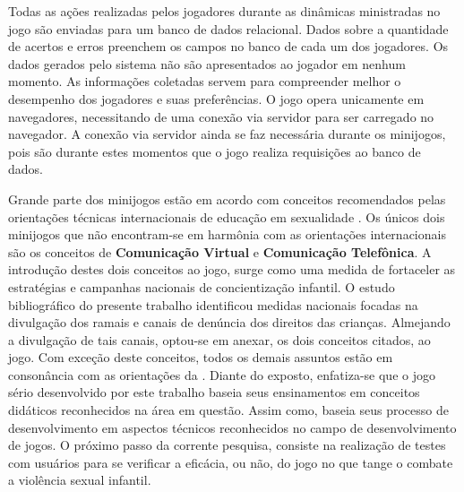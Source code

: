 Todas as ações realizadas pelos jogadores durante as dinâmicas ministradas no jogo são enviadas para um banco de dados relacional. Dados sobre a quantidade de acertos e erros preenchem os campos no banco de cada um dos jogadores. Os dados gerados pelo sistema não são apresentados ao jogador em nenhum momento. As informações coletadas servem para compreender melhor o desempenho dos jogadores e suas preferências. O jogo opera unicamente em navegadores, necessitando de uma conexão via servidor para ser carregado no navegador. A conexão via servidor ainda se faz necessária durante os minijogos, pois são durante estes momentos que o jogo realiza requisições ao banco de dados. 


Grande parte dos minijogos estão em acordo com conceitos recomendados pelas orientações técnicas internacionais de educação em sexualidade \cite{women2018international}. Os únicos dois minijogos que não encontram-se em harmônia com as orientações internacionais são os conceitos de \textbf{Comunicação Virtual} e \textbf{Comunicação Telefônica}. A introdução destes dois conceitos ao jogo, surge como uma medida de fortaceler as estratégias e campanhas nacionais de concientização infantil. O estudo bibliográfico do presente trabalho identificou medidas nacionais focadas na divulgação dos ramais e canais de denúncia dos direitos das crianças. Almejando a divulgação de tais canais, optou-se em anexar, os dois conceitos citados, ao jogo. Com exceção deste conceitos, todos os demais assuntos estão em consonância com as orientações da . Diante do exposto, enfatiza-se que o jogo sério desenvolvido por este trabalho baseia seus ensinamentos em conceitos didáticos reconhecidos na área em questão. Assim como, baseia seus processo de desenvolvimento em aspectos técnicos reconhecidos no campo de  desenvolvimento de jogos. O próximo passo da corrente pesquisa, consiste na realização de testes com usuários para se verificar a eficácia, ou não, do jogo no que tange o combate a violência sexual infantil. 






